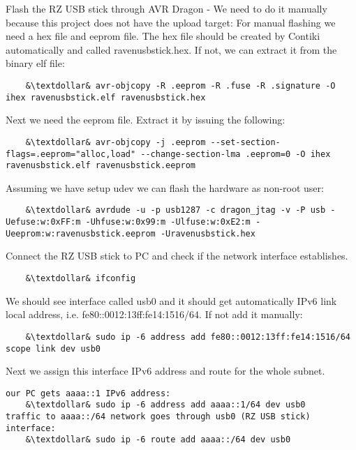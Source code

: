 \documentclass{article}
\begin{document}
Flash the RZ USB stick through AVR Dragon - We need to do it manually because this project does not have the upload target:
For manual flashing we need a hex file and eeprom file. The hex file should be created by Contiki automatically and called ravenusbstick.hex.
If not, we can extract it from the binary elf file:
\begin{lstlisting}
	&\textdollar& avr-objcopy -R .eeprom -R .fuse -R .signature -O ihex ravenusbstick.elf ravenusbstick.hex
\end{lstlisting}
Next we need the eeprom file. Extract it by issuing the following:
\begin{lstlisting}
	&\textdollar& avr-objcopy -j .eeprom --set-section-flags=.eeprom="alloc,load" --change-section-lma .eeprom=0 -O ihex ravenusbstick.elf ravenusbstick.eeprom
\end{lstlisting}
Assuming we have setup udev we can flash the hardware as non-root user: %
\begin{lstlisting}
	&\textdollar& avrdude -u -p usb1287 -c dragon_jtag -v -P usb -Uefuse:w:0xFF:m -Uhfuse:w:0x99:m -Ulfuse:w:0xE2:m -Ueeprom:w:ravenusbstick.eeprom -Uravenusbstick.hex
\end{lstlisting}

Connect the RZ USB stick to PC and check if the network interface establishes.
\begin{lstlisting}
	&\textdollar& ifconfig
\end{lstlisting}

We should see interface called usb0 and it should get automatically IPv6 link local address, i.e. fe80::0012:13ff:fe14:1516/64.
If not add it manually:
\begin{lstlisting}
	&\textdollar& sudo ip -6 address add fe80::0012:13ff:fe14:1516/64 scope link dev usb0
\end{lstlisting}
Next we assign this interface IPv6 address and route for the whole subnet.
\begin{lstlisting}
our PC gets aaaa::1 IPv6 address:
	&\textdollar& sudo ip -6 address add aaaa::1/64 dev usb0
traffic to aaaa::/64 network goes through usb0 (RZ USB stick) interface:
	&\textdollar& sudo ip -6 route add aaaa::/64 dev usb0
\end{lstlisting}
\end{document}
